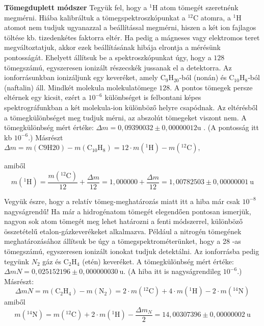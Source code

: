 \documentclass[../main.tex]{subfiles}
\begin{document}
\textbf{Tömegduplett módszer}  
Tegyük fel, hogy a $^{1}\mathrm{H}$ atom tömegét szeretnénk megmérni. Hiába kalibráltuk a tömegspektroszkópunkat a $^{12}\mathrm{C}$ atomra, a $^{1}\mathrm{H}$ atomot nem tudjuk ugyanazzal a beállítással megmérni,
hiszen a két ion fajlagos töltése kb. tizedenkétes faktorra eltér. Ha pedig a mágneses vagy elektromos teret megváltoztatjuk, akkor ezek beállításának hibája elrontja a mérésünk pontosságát.
Ehelyett állítsuk be a spektroszkópunkat úgy, hogy a $128$ tömegszámú, egyszeresen ionizált részecskék jussanak el a detektorra. Az ionforrásunkban ionizáljunk egy keveréket, amely $\mathrm{C}_9\mathrm{H}_{20}$‑ból (nonán) és $\mathrm{C}_{10}\mathrm{H}_{8}$‑ból (naftalin) áll.
Mindkét molekula molekulatömege $128$. A pontos tömegek persze eltérnek egy kicsit, ezért a $10^{-6}$ különbséget is felbontani képes spektrográfunkban a két molekula‑ion különböző helyre csapódnak. Az eltérésből a tömegkülönbséget meg tudjuk mérni, az abszolút tömegeket viszont nem.
A tömegkülönbség mért értéke:  $\Delta m = 0,093 90032 \pm 0,000 00012 \text{u}$ . (A pontosság itt kb $10^{-6}$.) Másrészt
$\Delta m = m(\mathrm{C}9\mathrm{H}{20}) - m(\mathrm{C}_{10}\mathrm{H}_8) = 12\cdot m(^{1}\mathrm{H}) - m(^{12}\mathrm{C}),$

amiből
\begin{equation} m(^{1}\mathrm{H}) = \frac{m(^{12}\mathrm{C})}{12} + \frac{\Delta m}{12} = 1{,}000000 + \frac{\Delta m}{12} = 1{,}00782503 \pm 0{,}00000001\ \mathrm{u} \tag{1.21} \end{equation}

Vegyük észre, hogy a relatív tömeg-meghatározás miatt itt a hiba már csak $10^{-8}$ nagyságrendű! Ha már a hidrogénatom tömegét elegendően pontosan ismerjük, nagyon sok atom tömegét meg lehet határozni a fenti módszerrel, különböző összetételű etalon‑gázkeverékeket alkalmazva. Például a nitrogén tömegének meghatározásához állítsuk be úgy a tömegspektrométerünket, hogy a 28 ‑as tömegszámú, egyszeresen ionizált ionokat tudjuk detektálni. Az ionforrásba pedig tegyünk $N_2$ gáz és $\mathrm{C}_2\mathrm{H}_4$ (etén) keveréket. A tömegkülönbség mért értéke: $\Delta m{N} = 0{,}025152196 \pm 0{,}000000030\ \mathrm{u}.$ (A hiba itt is nagyságrendileg $10^{-6}$.) Másrészt:
\begin{equation}
    \Delta m{N} = m(\mathrm{C}_2\mathrm{H}_4) - m(\mathrm{N}_2) = 2\cdot m(^{12}\mathrm{C}) + 4\cdot m(^{1}\mathrm{H}) - 2\cdot m(^{14}\mathrm{N})
\end{equation}
amiből
\begin{equation} m(^{14}\mathrm{N}) = m(^{12}\mathrm{C}) + 2\cdot m(^{1}\mathrm{H}) - \frac{\Delta m_{N}}{2} = 14{,}00307396 \pm 0{,}00000002\ \mathrm{u} \tag{1.23} \end{equation}
\end{document}
